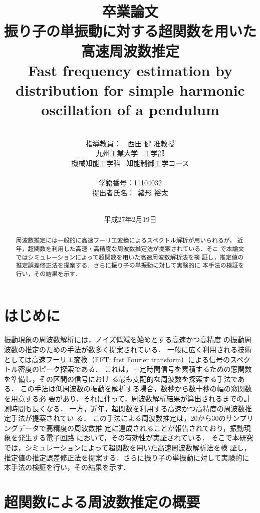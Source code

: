 \documentclass[a4paper,12pt]{jarticle}
\title{卒業論文\\
振り子の単振動に対する超関数を用いた\\高速周波数推定\\
{\normalsize Fast frequency estimation by distribution
for simple harmonic oscillation of a pendulum}
}
\author{\vspace{20mm}\\
指導教員：\ \ 西田 健 准教授\\
九州工業大学\ \hspace{0mm} 工学部\\
機械知能工学科\ \hspace{0mm} 知能制御工学コース \\
\vspace{0mm}\\
学籍番号：11104032\\
提出者氏名：\ 緒形 \hspace{0mm} 裕太\\\vspace{5mm}\\ }
\date{平成27年2月19日}
\begin{document}
\titlepage
\maketitle
\thispagestyle{empty}
\newpage

\begin{abstract}
周波数推定には一般的に高速フーリエ変換によるスペクトル解析が用いられるが，
近年，超関数を利用した高速・高精度な周波数推定法が提案されている．そこ
で本論文ではシミュレーションによって超関数を用いた高速周波数解析法を検
証し，推定値の推定誤差修正法を提案する．さらに振り子の単振動に対して実験的に
本手法の検証を行い，その結果を示す．
\end{abstract}
\thispagestyle{empty}

\newpage

\thispagestyle{empty}
\tableofcontents
\newpage

\section{はじめに}
%
振動現象の周波数解析には，ノイズ低減を始めとする高速かつ高精度
の振動周波数の推定のための手法が数多く提案されている．
%
一般に広く利用される技術としては高速フーリエ変換（FFT: fast Fourier
transform）による信号のスペクトル密度のピーク探索である．
%
これは，一定時間信号を累積するための窓関数を準備し，その区間の信号におけ
る最も支配的な周波数を探索する手法である\cite{fourier}．
%
この手法は低周波数の振動を解析する場合，数秒から数十秒の幅の窓関数を用意する必
要があり，それに伴って，周波数解析結果が算出されるまでの計測時間も長くなる\cite{digital}．
%
一方，近年，超関数を利用する高速かつ高精度の周波数推定手法が提案されてい
る\cite{sf}．
%
この手法による周波数推定は，20から30のサンプリングデータで高精度の周波数推
定に達成されることが報告されており\cite{sf}，振動現象を発生する電子回路
において，その有効性が実証されている．
%
そこで本研究では，シミュレーションによって超関数を用いた高速周波数解析法を検
証し，推定値の推定誤差修正法を提案する．さらに振り子の単振動に対して実験的に
本手法の検証を行い，その結果を示す．
\section{超関数による周波数推定の概要}
\label{sec:distributions}
\end{document}
